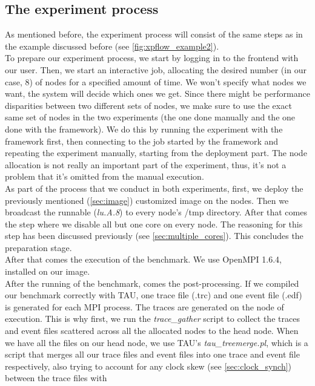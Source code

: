 \subsection{The experiment process}
\label{sec:experiment_process}
As mentioned before, the experiment process will consist of the same
steps as in the example discussed before
(see \ref{fig:xpflow_example2}).\\
To prepare our experiment process, we start by
logging in to the frontend with our user. Then, we start an
interactive job, allocating the desired number (in our case, 8) of
nodes for a specified amount of time. We won't specify what nodes we
want, the system will decide which ones we get. Since there might be
performance disparities between two different sets of nodes, we make
sure to use the exact same set of nodes in the two experiments (the
one done manually and the one done with the framework). We do this by
running the experiment with the framework first, then connecting to
the job started by the framework and repeating the experiment
manually, starting from the deployment part. The node allocation is
not really an important part of the experiment, thus, it's not a
problem that it's omitted from the manual execution.\\
As part of the process that we conduct in both experiments, first, we
deploy the previously mentioned (\ref{sec:image}) customized image on the
nodes. Then we broadcast the runnable (\emph{lu.A.8}) to every node's
/tmp directory. After that comes the step where we disable all but one
core on every node. The reasoning for this step has been discussed
previously (see \ref{sec:multiple_cores}). This concludes the
preparation stage.\\
After that comes the execution of the benchmark. We use OpenMPI 1.6.4,
installed on our image.\\
After the running of the benchmark, comes the post-processing. If we
compiled our benchmark correctly with TAU, one trace file (.trc)
and one event file (.edf) is generated for each MPI process. The
traces are generated on the node of execution. This is why first,
we run the \emph{trace\_gather}\cite{ms11} script to collect the traces
and event files scattered across all the allocated nodes to the head
node. When we have all the files on our head node, we use
TAU's \emph{tau\_treemerge.pl}, which is a script that merges all our
trace files and event files into one trace and event file
respectively, also trying to account for any clock skew
(see \ref{sec:clock_synch}) between the trace files with
